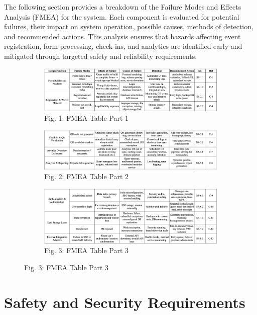 \documentclass{article}
\begin{document}
The following section provides a breakdown of the Failure Modes and Effects Analysis (FMEA) for the system. Each component is evaluated for potential failures, their impact on system operation, possible causes, methods of detection, and recommended actions. This analysis ensures that hazards affecting event registration, form processing, check-ins, and analytics are identified early and mitigated through targeted safety and reliability requirements.
\begin{figure}[H]
\begin{subfigure}{\textwidth}
    \centering\includegraphics[width=\textwidth]{FMEA_images/FMEA_1.png} 
    \caption{Fig. 1: FMEA Table Part 1}
\end{subfigure}

\begin{subfigure}{\textwidth}
    \centering\includegraphics[width=\textwidth]{FMEA_images/FMEA_2.png}
    \caption{Fig. 2: FMEA Table Part 2}
\end{subfigure}

\begin{subfigure}{\textwidth}
    \centering\includegraphics[width=\textwidth]{FMEA_images/FMEA_3.png}
    \caption{Fig. 3: FMEA Table Part 3}
\end{subfigure}
\end{figure}



\section{Safety and Security Requirements}
\end{document}
